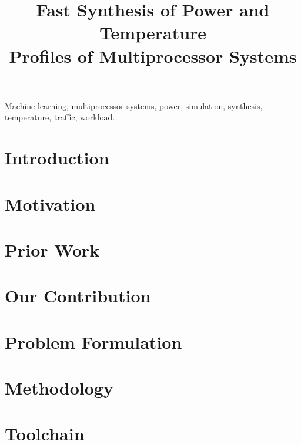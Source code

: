 \documentclass[conference]{IEEEtran}
\title{
  Fast Synthesis of Power and Temperature\\
  Profiles of Multiprocessor Systems
  \vspace{-2em}
}
\author{}
\begin{document}
  \maketitle
  \thispagestyle{plain}
  \pagestyle{plain}

  \begin{abstract}
    
  \end{abstract}

  \begin{IEEEkeywords}
    Machine learning,
    multiprocessor systems,
    power,
    simulation,
    synthesis,
    temperature,
    traffic,
    workload.
  \end{IEEEkeywords}


  \section{Introduction} 
  

  \section{Motivation} 
  

  \section{Prior Work}

  \section{Our Contribution} 
  
  

  \section{Problem Formulation} 
  

  \section{Methodology} 
  

  \section{Toolchain} 
  
\end{document}
